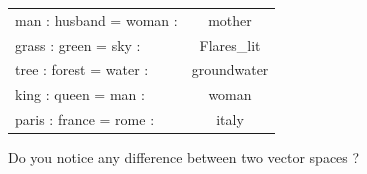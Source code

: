 \documentclass[12pt,fleqn]{article}
\begin{document}
\begin{enumerate}
\begin{itemize}
\begin{table}[htb!] 
   \begin{center} 
         \begin{tabular}{lc}
man : husband = woman :& mother  \\ 
grass : green = sky : & Flares\_lit \\ 
tree : forest = water : & groundwater \\ 
king : queen = man : & woman \\ 
paris : france = rome : & italy \\
         \end{tabular}
   \end{center}
\end{table}
\end{itemize}

Do you notice any difference between two vector spaces ? 

\end{enumerate}  
% 
% 
\end{document}
